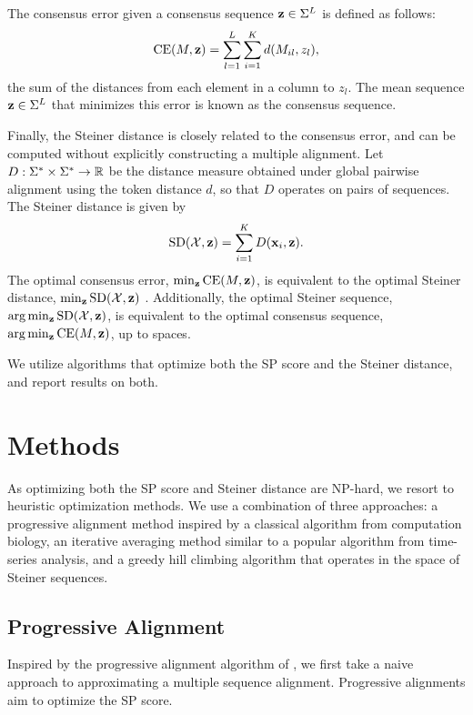 \documentclass{article}
\begin{document}
The consensus error given a consensus sequence $\mathbf{z}\in\Sigma^L$ is defined as follows:
\begin{equation}
\mathrm{CE}(M, \mathbf{z}) = \sum_{l=1}^L \sum_{i=1}^K d(M_{il}, z_{l}),
\end{equation}
the sum of the distances from each element in a column to $z_l$.
The mean sequence $\mathbf{z}\in\Sigma^L$ that minimizes this error is known as the consensus sequence.

Finally, the Steiner distance is closely related to the consensus error,
and can be computed without explicitly constructing a multiple alignment.
Let $D: \Sigma^* \times \Sigma^* \to \mathbb{R}$
be the distance measure obtained under global pairwise alignment using the token distance $d$,
so that $D$ operates on pairs of sequences.
The Steiner distance is given by
\begin{equation}
\mathrm{SD}(\mathcal{X}, \mathbf{z}) = \sum_{i=1}^K D(\mathbf{x}_i, \mathbf{z}).
\end{equation}
The optimal consensus error, $\min_{\mathbf{z}}\mathrm{CE}(M,\mathbf{z})$,
is equivalent to the optimal Steiner distance, $\min_{\mathbf{z}}\mathrm{SD}(\mathcal{X}, \mathbf{z})$
\citep{gusfield1997}.
Additionally, the optimal Steiner sequence, $\arg\min_{\mathbf{z}}\mathrm{SD}(\mathcal{X}, \mathbf{z})$,
is equivalent to the optimal consensus sequence, $\arg\min_{\mathbf{z}}\mathrm{CE}(M,\mathbf{z})$,
up to spaces.

We utilize algorithms that optimize both the SP score and the Steiner distance,
and report results on both.

\section{Methods}
As optimizing both the SP score and Steiner distance are NP-hard,
we resort to heuristic optimization methods.
We use a combination of three approaches: a progressive alignment method
inspired by a classical algorithm from computation biology,
an iterative averaging method similar to a popular algorithm from time-series analysis,
and a greedy hill climbing algorithm that operates in the space of Steiner sequences.

\subsection{Progressive Alignment}
Inspired by the progressive alignment algorithm
of \citet{fengdoolittle}, we first take a naive approach to approximating
a multiple sequence alignment.
Progressive alignments aim to optimize the SP score.
\end{document}
